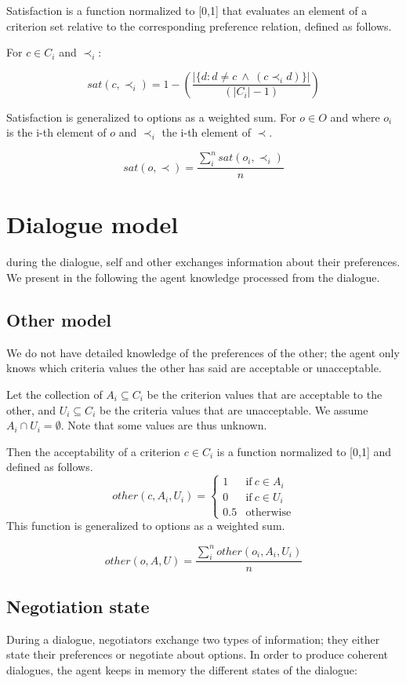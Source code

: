 \documentclass{article}
\begin{document}
	Satisfaction is a function normalized to [0,1] that evaluates an element of a criterion set relative to the corresponding preference relation, defined as follows.
	
	For $c \in C_i$ and $\prec_i$:
	
	$$sat(c, \prec_i) =	1 - \left( \frac{|\{d : d \neq c \  \wedge \ (c \prec_i d)\}| }{( |C_i| - 1 )}\right)  $$
	
	Satisfaction is generalized to options as a weighted sum.
	For $o \in O$ and where $o_i$ is the i-th element of $o$ and $\prec_i$ the i-th element of $\prec$.
	
	$$sat(o, \prec) = \frac{\sum_{i}^{n} sat(o_i, \prec_i) }{n} $$
	
	
	\section{Dialogue model}
	during the dialogue, self and other exchanges information about their preferences. We present in the following the agent knowledge processed from the dialogue.
	\subsection{Other model}
		We do not have detailed knowledge of the preferences of the other; the agent only knows which criteria values the other has said are acceptable or unacceptable.

		Let the collection of $A_i \subseteq C_i$ be the criterion values that are acceptable to the other, and $U_i \subseteq C_i$ be the criteria values that are unacceptable.  We assume $A_i \cap U_i = \emptyset$.  Note	that some values are thus unknown.

		Then the acceptability of a criterion $c \in C_i$ is a function normalized to [0,1] and defined as follows.
		$$ other(c, A_i, U_i)= \left\{\begin{array}{ll}
			1	 & \mathrm{if\ }  c \in A_i\\
			0    & \mathrm{if\ }c \in U_i\\
			0.5	 & \mathrm{otherwise}
			\end{array}\right.$$
		This function is generalized to options as a weighted sum.
	
		$$other(o, A, U) = \frac{ \sum_{i}^{n} other(o_i, A_i, U_i) } {n}$$ 
	
	\subsection{Negotiation state}
		During a dialogue, negotiators exchange two types of information; they either state their preferences or negotiate about options. In order to produce coherent dialogues, the agent keeps in memory the different states of the dialogue: 
		
\end{document}
